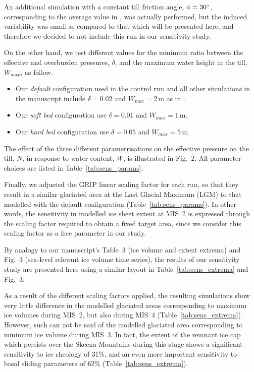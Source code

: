 An additional simulation with a constant till friction angle, $\phi=30^{\circ}$,
corresponding to the average value in \citet[p.~268]{Cuffey.Paterson.2010}, was
actually performed, but the induced variability was small as compared to that
which will be presented here, and therefore we decided to not include this run
in our sensitivity study.

On the other hand, we test different values for the minimum ratio between the
effective and overburden pressures, $\delta$, and the maximum water
height in the till, $W_{max}$, as follow.

\begin{itemize}
    \item{Our \emph{default} configuration used in the control run and all other
          simulations in the manuscript include $\delta=0.02$ and
          $W_{max}=2$\,m as in \citet{Bueler.Pelt.2015}.}
    \item{Our \emph{soft bed} configuration use $\delta=0.01$ and
          $W_{max}=1$\,m.}
    \item{Our \emph{hard bed} configuration use $\delta=0.05$ and
          $W_{max}=5$\,m.}
\end{itemize}

The effect of the three different parametrisations on the effective pressure on
the till, $N$, in response to water content, $W$, is illustrated in
Fig.~2.
All parameter choices are listed in Table~\ref{tab:sens_params}.

Finally, we adjusted the GRIP linear scaling factor for each run, so that they
result in a similar glaciated area at the Last Glacial Maximum (LGM) to that
modelled with the default configuration (Table~\ref{tab:sens_params}).
In other words, the sensitivity in modelled ice sheet extent at MIS~2 is
expressed through the scaling factor required to obtain a fixed target area,
since we consider this scaling factor as a free parameter in our study.


By analogy to our manuscript's Table~3 (ice volume and extent extrema) and
Fig.~3 (sea-level relevant ice volume time series), the results of our
sensitivity study are presented here using a similar layout in
Table~\ref{tab:sens_extrema} and Fig.~3.

As a result of the different scaling factors applied, the resulting simulations
show very little difference in the modelled glaciated areas corresponding to
maximum ice volumes during MIS~2, but also during MIS~4
(Table~\ref{tab:sens_extrema}). However, such can not be said of the modelled
glaciated area corresponding to minimum ice volume during MIS~3. In fact, the
extent of the remnant ice cap which persists over the Skeena Mountains during
this stage shows a significant sensitivity to ice rheology of 31\%, and
an even more important sensitivity to basal sliding parameters of 62\%
(Table~\ref{tab:sens_extrema}).

